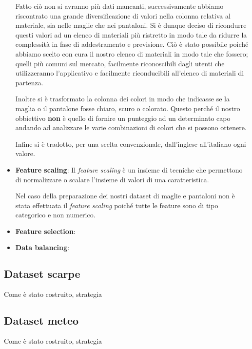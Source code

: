 \documentclass[a4paper, 11pt, oneside]{report}
\begin{document}
\begin{itemize}
                    \par \noindent Fatto ciò non si avranno più dati mancanti, successivamente abbiamo riscontrato una grande
                    diversificazione di valori nella colonna relativa al materiale, sia nelle maglie che nei pantaloni.
                    Si è dunque deciso di ricondurre questi valori ad un elenco di materiali più ristretto in modo tale da ridurre
                    la complessità in fase di addestramento e previsione.
                    Ciò è stato possibile poiché abbiamo scelto con cura il nostro elenco di materiali in modo tale che fossero;
                    quelli più comuni sul mercato, facilmente riconoscibili dagli utenti che utilizzeranno l'applicativo e
                    facilmente riconducibili all'elenco di materiali di partenza.
                    \par \noindent Inoltre si è trasformato la colonna dei colori in modo che indicasse se la maglia o il pantalone
                    fosse chiaro, scuro o colorato.
                    Questo perché il nostro obbiettivo \textbf{non} è quello di fornire un punteggio ad un determinato capo andando ad
                    analizzare le varie combinazioni di colori che si possono ottenere.
                    \par \noindent Infine si è tradotto, per una scelta convenzionale, dall'inglese all'italiano ogni valore.
                    \item \textbf{Feature scaling}: Il \textit{feature scaling} è un insieme di tecniche che permettono di
                    normalizzare o scalare l'insieme di valori di una caratteristica.
                    \par \noindent Nel caso della preparazione dei nostri dataset di maglie e pantaloni non è stata effettuata
                    il  \textit{feature scaling} poiché tutte le feature sono di tipo categorico e non numerico.
                    \item \textbf{Feature selection}:
                    \item \textbf{Data balancing}:
                \end{itemize}
                \subsection{Dataset scarpe}
                Come è stato costruito, strategia
                \subsection{Dataset meteo}
                Come è stato costruito, strategia
\end{document}
